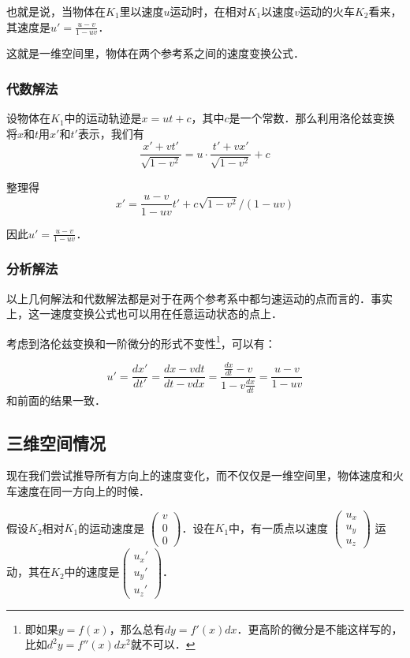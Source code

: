 也就是说，当物体在$K_1$里以速度$u$运动时，在相对$K_1$以速度$v$运动的火车$K_2$看来，其速度是$u'=\frac{u-v}{1-uv}$．

这就是一维空间里，物体在两个参考系之间的速度变换公式．

\subsubsection{代数解法}

设物体在$K_1$中的运动轨迹是$x=ut+c$，其中$c$是一个常数．那么利用洛伦兹变换将$x$和$t$用$x'$和$t'$表示，我们有$$\frac{x'+vt'}{\sqrt{1-v^2}}=u\cdot\frac{t'+vx'}{\sqrt{1-v^2}}+c$$

整理得$$x'=\frac{u-v}{1-uv}t'+c\sqrt{1-v^2}/(1-uv)$$

因此$u'=\frac{u-v}{1-uv}$．

\subsubsection{分析解法}

以上几何解法和代数解法都是对于在两个参考系中都匀速运动的点而言的．事实上，这一速度变换公式也可以用在任意运动状态的点上．

考虑到洛伦兹变换和一阶微分的形式不变性\footnote{即如果$y=f(x)$，那么总有$dy=f'(x)dx$．更高阶的微分是不能这样写的，比如$d^2y=f''(x)dx^2$就不可以．}，可以有：

$$u'=\frac{dx'}{dt'}=\frac{dx-vdt}{dt-vdx}=\frac{\frac{dx}{dt}-v}{1-v\frac{dx}{dt}}=\frac{u-v}{1-uv}$$和前面的结果一致．


\subsection{三维空间情况}

现在我们尝试推导所有方向上的速度变化，而不仅仅是一维空间里，物体速度和火车速度在同一方向上的时候．

假设$K_2$相对$K_1$的运动速度是 $\begin{pmatrix}v\\0\\0\end{pmatrix}$．设在$K_1$中，有一质点以速度 $\begin{pmatrix}u_x\\u_y\\u_z\end{pmatrix}$ 运动，其在$K_2$中的速度是$\left(\begin{matrix}u_x'\\u_y'\\u_z'\end{matrix} \right) $．

